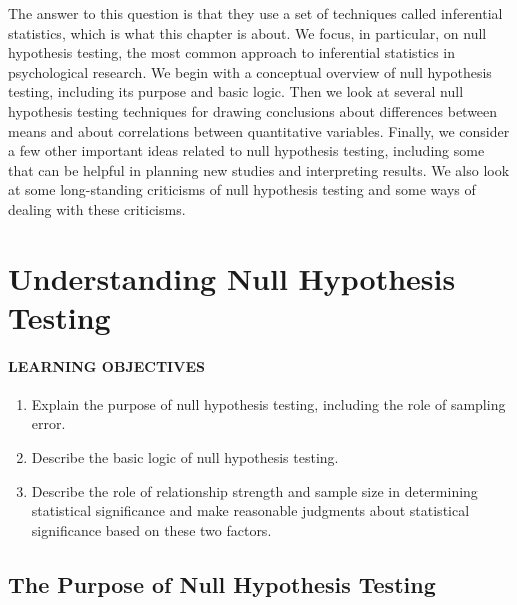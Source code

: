 \documentclass[
]{krantz}
\providecommand{\tightlist}{%
  \setlength{\itemsep}{0pt}\setlength{\parskip}{0pt}}
\begin{document}
The answer to this question is that they use a set of techniques called inferential statistics, which is what this chapter is about. We focus, in particular, on null hypothesis testing, the most common approach to inferential statistics in psychological research. We begin with a conceptual overview of null hypothesis testing, including its purpose and basic logic. Then we look at several null hypothesis testing techniques for drawing conclusions about differences between means and about correlations between quantitative variables. Finally, we consider a few other important ideas related to null hypothesis testing, including some that can be helpful in planning new studies and interpreting results. We also look at some long-standing criticisms of null hypothesis testing and some ways of dealing with these criticisms.

\hypertarget{understanding-null-hypothesis-testing}{%
\section{Understanding Null Hypothesis Testing}\label{understanding-null-hypothesis-testing}}

\hypertarget{learning-objectives-38}{%
\paragraph*{LEARNING OBJECTIVES}\label{learning-objectives-38}}

\begin{enumerate}
\def\labelenumi{\arabic{enumi}.}
\tightlist
\item
  Explain the purpose of null hypothesis testing, including the role of sampling error.
\item
  Describe the basic logic of null hypothesis testing.
\item
  Describe the role of relationship strength and sample size in determining statistical significance and make reasonable judgments about statistical significance based on these two factors.
\end{enumerate}

\hypertarget{the-purpose-of-null-hypothesis-testing}{%
\subsection*{The Purpose of Null Hypothesis Testing}\label{the-purpose-of-null-hypothesis-testing}}
\end{document}
